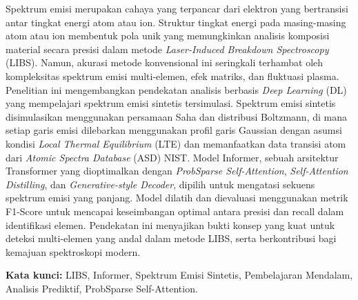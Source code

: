 \begin{abstractind}

Spektrum emisi merupakan cahaya yang terpancar dari elektron yang bertransisi antar tingkat energi atom atau ion. Struktur tingkat energi pada masing-masing atom atau ion membentuk pola unik yang memungkinkan analisis komposisi material secara presisi dalam metode \textit{Laser-Induced Breakdown Spectroscopy} (LIBS). Namun, akurasi metode konvensional ini seringkali terhambat oleh kompleksitas spektrum emisi multi-elemen, efek matriks, dan fluktuasi plasma. Penelitian ini mengembangkan pendekatan analisis berbasis \textit{Deep Learning} (DL) yang mempelajari spektrum emisi sintetis tersimulasi. Spektrum emisi sintetis disimulasikan menggunakan persamaan Saha dan distribusi Boltzmann, di mana setiap garis emisi dilebarkan menggunakan profil garis Gaussian dengan asumsi kondisi \textit{Local Thermal Equilibrium} (LTE) dan memanfaatkan data transisi atom dari \textit{Atomic Spectra Database} (ASD) NIST. Model Informer, sebuah arsitektur Transformer yang dioptimalkan dengan \textit{ProbSparse Self-Attention}, \textit{Self-Attention Distilling}, dan \textit{Generative-style Decoder}, dipilih untuk mengatasi sekuens spektrum emisi yang panjang. Model dilatih dan dievaluasi menggunakan metrik F1-Score untuk mencapai keseimbangan optimal antara presisi dan recall dalam identifikasi elemen. Pendekatan ini menyajikan bukti konsep yang kuat untuk deteksi multi-elemen yang andal dalam metode LIBS, serta berkontribusi bagi kemajuan spektroskopi modern.

\bigskip
\noindent
\textbf{Kata kunci:} LIBS, Informer, Spektrum Emisi Sintetis, Pembelajaran Mendalam, Analisis Prediktif, ProbSparse Self-Attention.
\end{abstractind}



